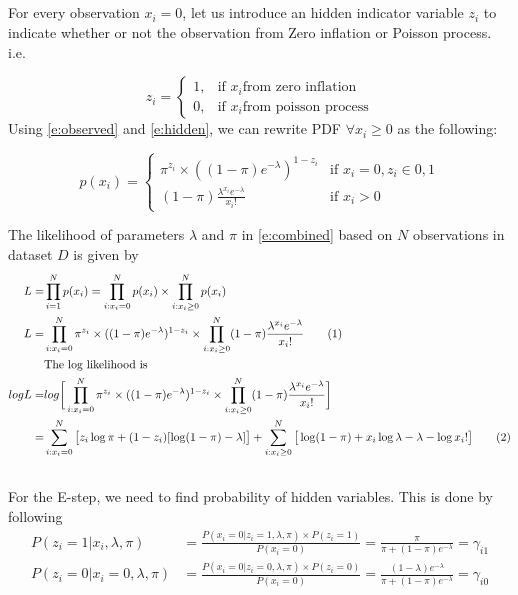 \documentclass[a4paper,doc,notimes]{article}
\newcommand\numberthis{\addtocounter{equation}{1}\tag{\theequation}}
\begin{document}
\subsection{}

For every observation $x_i=0$, let us introduce an hidden indicator variable $z_i$ to indicate whether or not the observation from Zero inflation or Poisson process. i.e. 

\begin{equation}\label{e:hidden}
z_i = \begin{cases}
1,& \text{if } x_i \text{from zero inflation}\\
0,&  \text{if } x_i \text{from poisson process} 
\end{cases}
\end{equation}
Using \ref{e:observed} and \ref{e:hidden}, we can rewrite PDF $\forall x_i \ge 0 $ as the following:

\begin{equation}\label{e:combines}
p(x_i) = \begin{cases}
\pi^{z_i} \times ((1-\pi) e^{-\lambda})^{1-z_i} & \text{if } x_i = 0, z_i \in{0,1}\\
(1-\pi) \frac{\lambda^{x_i} e^{-\lambda}}{x_i!} &  \text{if } x_i > 0
\end{cases}
\end{equation}


The likelihood of parameters $\lambda$ and $\pi$ in \ref{e:combined} based on $N$ observations in dataset $D$ is given by
\begin{align*}
L = & \prod_{i=1}^{N} p(x_i) = \prod_{i:x_i=0}^{N} p(x_i) \times \prod_{i:x_i \ge 0}^{N} p(x_i) \\
L = &  \prod_{i:x_i=0}^{N} \pi^{z_i} \times ((1-\pi) e^{-\lambda})^{1-z_i} \times \prod_{i:x_i \ge 0}^{N} (1-\pi) \frac{\lambda^{x_i} e^{-\lambda}}{x_i!} \numberthis \\
& \text{The log likelihood is} \\
log L = & log \bigg[ \prod_{i:x_i=0}^{N} \pi^{z_i} \times ((1-\pi) e^{-\lambda})^{1-z_i} \times \prod_{i:x_i \ge 0}^{N} (1-\pi) \frac{\lambda^{x_i} e^{-\lambda}}{x_i!} \bigg] \\
= & \sum_{i:x_i=0}^{N} \big[z_i \log \pi +  (1 - z_i)[\log (1- \pi) -\lambda]\big] 
  + \sum_{i:x_i \ge 0}^{N} \big[\log(1- \pi) + x_i \log \lambda -\lambda - \log x_i! \big] \numberthis \label{e:loglike}
\end{align*}
\subsection{}
For the E-step, we need to find probability of hidden variables. This is done by following
\begin{align*}
	P(z_i=1|x_i, \lambda, \pi) & = \frac{P(x_i=0|z_i=1, \lambda, \pi) \times P(z_i=1)}{P(x_i=0)} = \frac{\pi}{\pi + (1-\pi)e^{-\lambda}} = \gamma_{i1} \\
	P(z_i=0|x_i=0, \lambda, \pi) & = \frac{P(x_i=0|z_i=0, \lambda, \pi) \times P(z_i=0)}{P(x_i=0)} = \frac{(1-\lambda)e^{-\lambda}}{\pi + (1-\pi)e^{-\lambda}} = \gamma_{i0}
\end{align*}
\end{document}
